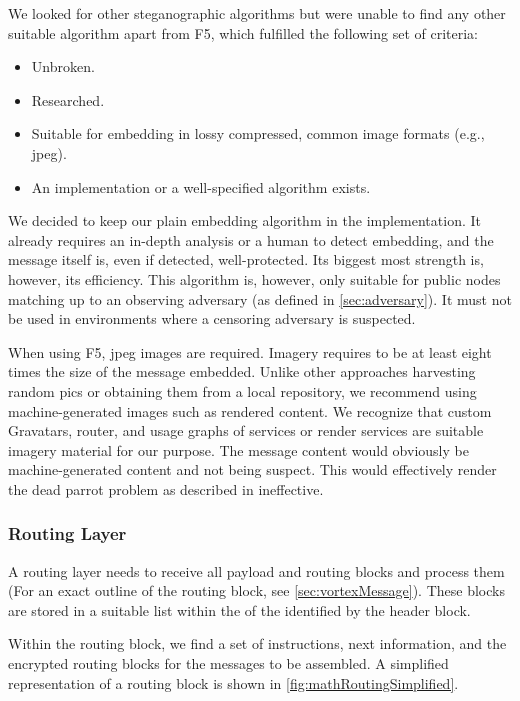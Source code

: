 We looked for other steganographic algorithms but were unable to find any other suitable algorithm apart from F5, which fulfilled the following set of criteria:
\begin{itemize}
	\item Unbroken.
	\item Researched.
	\item Suitable for embedding in lossy compressed, common image formats (e.g., jpeg).
	\item An implementation or a well-specified algorithm exists.
\end{itemize}

We decided to keep our plain embedding algorithm in the implementation. It already requires an in-depth analysis or a human to detect embedding, and the message itself is, even if detected, well-protected. Its biggest most strength is, however, its efficiency. This algorithm is, however, only suitable for public nodes matching up to an observing adversary (as defined in \cref{sec:adversary}). It must not be used in environments where a censoring adversary is suspected.

When using F5, jpeg images are required. Imagery requires to be at least eight times the size of the message embedded. Unlike other approaches harvesting random pics or obtaining them from a local repository, we recommend using machine-generated images such as rendered content. We recognize that custom Gravatars, router, and usage graphs of services or render services are suitable imagery material for our purpose. The message content would obviously be machine-generated content and not being suspect. This would effectively render the dead parrot problem as described in \cite{oakland2013-parrot} ineffective. 

\subsubsection{Routing Layer}\label{sec:routingLayer}
A routing layer needs to receive all payload and routing blocks and process them (For an exact outline of the routing block, see \cref{sec:vortexMessage}). These blocks are stored in a suitable list within the  of the  identified by the header block.

Within the routing block, we find a set of instructions, next \VortexNodes{} information, and the encrypted routing blocks for the messages to be assembled. A simplified representation of a routing block is shown in \cref{fig:mathRoutingSimplified}.

